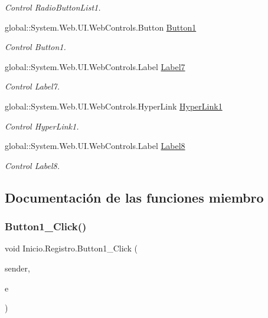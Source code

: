 \begin{DoxyCompactItemize}
\begin{DoxyCompactList}\small\item\em Control Radio\+Button\+List1. \end{DoxyCompactList}\item 
global\+::\+System.\+Web.\+U\+I.\+Web\+Controls.\+Button \mbox{\hyperlink{classInicio_1_1Registro_aa0ba82a780d379b638a877027de7a61b}{Button1}}
\begin{DoxyCompactList}\small\item\em Control Button1. \end{DoxyCompactList}\item 
global\+::\+System.\+Web.\+U\+I.\+Web\+Controls.\+Label \mbox{\hyperlink{classInicio_1_1Registro_a1f3fd3c1774cb311690a4246ba5aca66}{Label7}}
\begin{DoxyCompactList}\small\item\em Control Label7. \end{DoxyCompactList}\item 
global\+::\+System.\+Web.\+U\+I.\+Web\+Controls.\+Hyper\+Link \mbox{\hyperlink{classInicio_1_1Registro_aa4f71bea88748ad5dfc036a400cb4537}{Hyper\+Link1}}
\begin{DoxyCompactList}\small\item\em Control Hyper\+Link1. \end{DoxyCompactList}\item 
global\+::\+System.\+Web.\+U\+I.\+Web\+Controls.\+Label \mbox{\hyperlink{classInicio_1_1Registro_a8f64d7bc53c3f17751f32a57cef78ddb}{Label8}}
\begin{DoxyCompactList}\small\item\em Control Label8. \end{DoxyCompactList}\end{DoxyCompactItemize}


\subsection{Documentación de las funciones miembro}
\mbox{\label{classInicio_1_1Registro_a5fd08d11649d5319490065cdf317cdd0}} 
\subsubsection{\texorpdfstring{Button1\_Click()}{Button1\_Click()}}
{\footnotesize\ttfamily void Inicio.\+Registro.\+Button1\+\_\+\+Click (\begin{DoxyParamCaption}\item[{object}]{sender,  }\item[{Event\+Args}]{e }\end{DoxyParamCaption})\hspace{0.3cm}{\ttfamily [protected]}}

